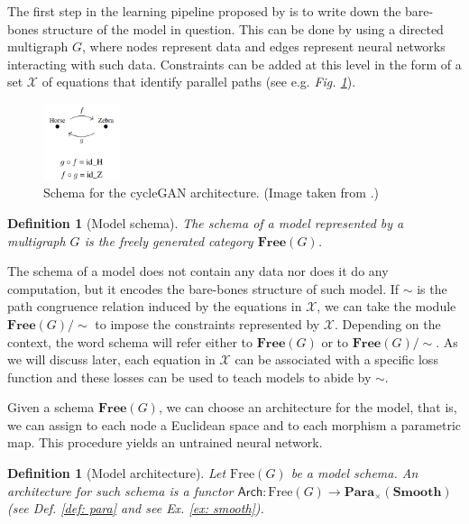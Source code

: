 \documentclass[11pt,a4paper,openright,twoside]{report}
\newcounter{mycounter}
\theoremstyle{plain}
\newtheorem{definition}[mycounter]{Definition}
\theoremstyle{definition}
\begin{document}
The first step in the learning pipeline proposed by \cite{gavranovic2019compositional} is to write down the bare-bones structure of the model in question. This can be done by using a directed multigraph $G$, where nodes represent data and edges represent neural networks interacting with such data. Constraints can be added at this level in the form of a set $\mathcal{X}$ of equations that identify parallel paths (see e.g. \textit{Fig. \ref{fig: cyclegan}}). 

\begin{figure}[h]
  \begin{center}
    \includegraphics[width=0.2\textwidth]{figures/cyclegan_schema.png}     
    \caption[CycleGAN schema]{Schema for the cycleGAN architecture. (Image taken from \cite{gavranovic2019compositional}.)}
    \label{fig: cyclegan}
  \end{center}
\end{figure}

\begin{definition}[Model schema]
  The schema of a model represented by a multigraph $G$ is the freely generated category $\mathbf{Free}(G)$.
\end{definition}

The schema of a model does not contain any data nor does it do any computation, but it encodes the bare-bones structure of such model. If ${\sim}$ is the path congruence relation induced by the equations in $\mathcal{X}$, we can take the module $\mathbf{Free}(G)/{\sim}$ to impose the constraints represented by $\mathcal{X}$. Depending on the context, the word schema will refer either to $\mathbf{Free}(G)$ or to $\mathbf{Free}(G)/{\sim}$. As we will discuss later, each equation in $\mathcal{X}$ can be associated with a specific loss function and these losses can be used to teach models to abide by ${\sim}$.

Given a schema $\mathbf{Free}(G)$, we can choose an architecture for the model, that is, we can assign to each node a Euclidean space and to each morphism a parametric map. This procedure yields an untrained neural network.

\begin{definition}[Model architecture]
  Let $\mathrm{Free}(G)$ be a model schema. An architecture for such schema is a functor $\mathsf{Arch}: \mathrm{Free}(G) \to \mathbf{Para}_{\times}(\mathbf{Smooth})$ (see \textit{Def. \ref{def: para}} and see \textit{Ex. \ref{ex: smooth}}).
\end{definition}
\end{document}
